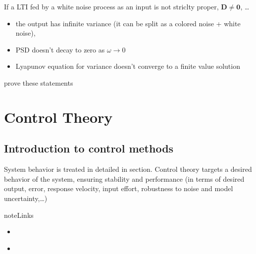 \documentclass[letterpaper,10pt,english]{jupyterBook}
\begin{document}
\sphinxAtStartPar
{} If a LTI fed by a white noise process as an input is not striclty proper, \(\mathbf{D} \ne \mathbf{0}\), …
\begin{itemize}
\item {} 
\sphinxAtStartPar
the output has infinite variance (it can be split as a colored noise + white noise),

\item {} 
\sphinxAtStartPar
PSD doesn’t decay to zero as \(\omega \rightarrow 0\)

\item {} 
\sphinxAtStartPar
Lyapunov equation for variance doesn’t converge to a finite value solution

\end{itemize}

\sphinxAtStartPar
{} prove these statements

\sphinxstepscope


\part{Control Theory}

\sphinxstepscope


\chapter{Introduction to control methods}
\label{\detokenize{ch/control/intro:introduction-to-control-methods}}\label{\detokenize{ch/control/intro:control-intro}}\label{\detokenize{ch/control/intro::doc}}
\sphinxAtStartPar
System behavior is treated in detailed in {\hyperref[\detokenize{ch/system-theory/intro:system-theory-intro}]{}} section. Control theory targets a desired behavior of the system, ensuring stability and performance (in terms of desired output, error, response velocity, input effort, robustness to noise and model uncertainty,…)

\begin{sphinxadmonition}{note}{Links}
\begin{itemize}
\item {} 
\sphinxAtStartPar
{\hyperref[\detokenize{ch/ode/intro:ode-intro}]{}}

\item {} 
\sphinxAtStartPar
{\hyperref[\detokenize{ch/system-theory/intro:system-theory-intro}]{}}

\end{itemize}
\end{sphinxadmonition}
\end{document}
